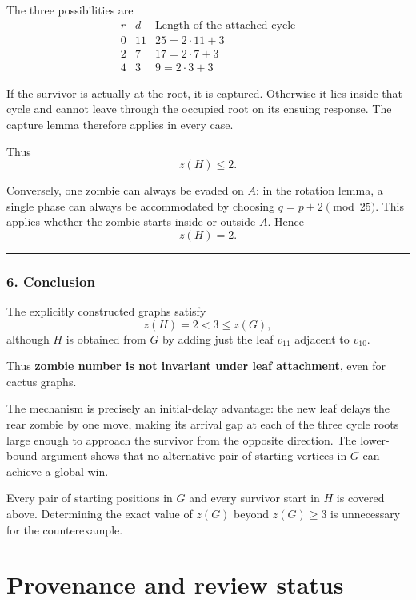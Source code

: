 \documentclass[
  11pt,
  a4paper,
]{article}
\begin{document}
The three possibilities are \[
\begin{array}{c|c|c}
r&d&\text{Length of the attached cycle}\\ \hline
0&11&25=2\cdot11+3\\
2&7&17=2\cdot7+3\\
4&3&9=2\cdot3+3
\end{array}
\]

If the survivor is actually at the root, it is captured. Otherwise it
lies inside that cycle and cannot leave through the occupied root on its
ensuing response. The capture lemma therefore applies in every case.

Thus \[
z(H)\le2.
\]

Conversely, one zombie can always be evaded on \(A\): in the rotation
lemma, a single phase can always be accommodated by choosing
\(q=p+2\pmod{25}\). This applies whether the zombie starts inside or
outside \(A\). Hence \[
\boxed{z(H)=2.}
\]

\begin{center}\rule{0.5\linewidth}{0.5pt}\end{center}

\subsubsection{6. Conclusion}\label{conclusion}

The explicitly constructed graphs satisfy \[
\boxed{z(H)=2<3\le z(G),}
\] although \(H\) is obtained from \(G\) by adding just the leaf
\(v_{11}\) adjacent to \(v_{10}\).

Thus \textbf{zombie number is not invariant under leaf attachment}, even
for cactus graphs.

The mechanism is precisely an initial-delay advantage: the new leaf
delays the rear zombie by one move, making its arrival gap at each of
the three cycle roots large enough to approach the survivor from the
opposite direction. The lower-bound argument shows that no alternative
pair of starting vertices in \(G\) can achieve a global win.

Every pair of starting positions in \(G\) and every survivor start in
\(H\) is covered above. Determining the exact value of \(z(G)\) beyond
\(z(G)\ge3\) is unnecessary for the counterexample.

\appendix

\section{Provenance and review
status}\label{provenance-and-review-status}
\end{document}

